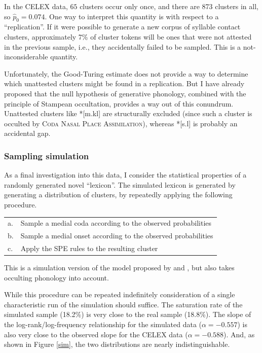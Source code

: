 \noindent In the CELEX data, $65$ clusters occur only once, and there are 873 clusters in all, so $\hat{p}_0 = 0.074$. One way to interpret this quantity is with respect to a ``replication''. If it were possible to generate a new corpus of syllable contact clusters, approximately 7\% of cluster tokens will be ones that were not attested in the previous sample, i.e., they accidentally failed to be sampled. This is a not-inconsiderable quantity. 

Unfortunately, the Good-Turing estimate does not provide a way to determine which unattested clusters might be found in a replication. But I have already proposed that the null hypothesis of generative phonology, combined with the principle of Stampean occultation, provides a way out of this conundrum. Unattested clusters like *[m.kl] are structurally excluded (since such a cluster is occulted by \textsc{Coda Nasal Place Assimilation}), whereas *[s.l] is probably an accidental gap.

\subsubsection{Sampling simulation}

As a final investigation into this data, I consider the statistical properties of a randomly generated novel ``lexicon''. The simulated lexicon is generated by  generating a distribution of clusters, by repeatedly applying the following procedure.

\begin{example}
\begin{tabular}{l l}
a. & Sample a medial coda according to the observed probabilities  \\
b. & Sample a medial onset according to the observed probabilities \\
c. & Apply the SPE rules to the resulting cluster                  \\
\end{tabular}
\end{example}

\noindent This is a simulation version of the model proposed by \citet{Pierrehumbert1994} and \citet{Coleman1997}, but also takes occulting phonology into account. 

While this procedure can be repeated indefinitely 
consideration of a single characteristic run of the simulation should suffice. The saturation rate of the simulated sample (18.2\%) is very close to the real sample (18.8\%). The slope of the log-rank/log-frequency relationship for the simulated data ($\alpha = -0.557$) is also very close to the observed slope for the CELEX data ($\alpha = -0.588$). And, as shown in Figure \ref{sim}, the two distributions are nearly indistinguishable. 

